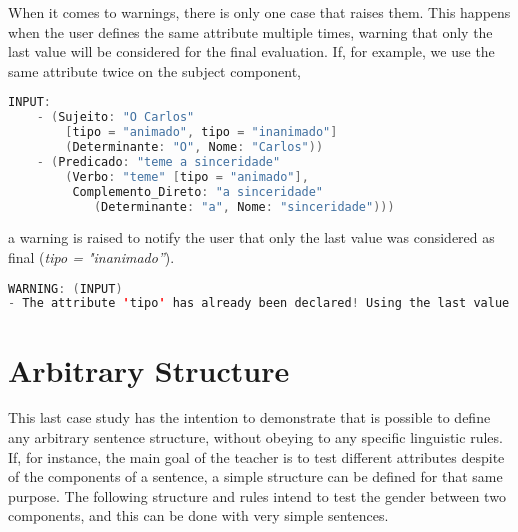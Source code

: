 When it comes to warnings, there is only one case that raises them. This happens when the user defines the same attribute multiple times, warning that only the last value 
will be considered for the final evaluation. If, for example, we use the same attribute twice on the subject component,

\begin{center}
\begin{minipage}{12cm}
\begin{lstlisting}[language=java, basicstyle=\small, label={lst:meta_input_attr_twice}, caption=Example of the students parsing with the same attribute in a single component]
INPUT:
    - (Sujeito: "O Carlos" 
        [tipo = "animado", tipo = "inanimado"]
        (Determinante: "O", Nome: "Carlos"))
    - (Predicado: "teme a sinceridade" 
        (Verbo: "teme" [tipo = "animado"], 
         Complemento_Direto: "a sinceridade" 
            (Determinante: "a", Nome: "sinceridade")))
\end{lstlisting}
\end{minipage}
\end{center}

\noindent a warning is raised to notify the user that only the last value was considered as final (\emph{tipo = "inanimado''}).

\begin{center}
\begin{minipage}{14cm}
\begin{lstlisting}[language=java, basicstyle=\small, label={lst:meta_input_missing_attr_warn}, caption=Example warning message of same attribute in a single component]
WARNING: (INPUT) 
- The attribute 'tipo' has already been declared! Using the last value found.
\end{lstlisting}
\end{minipage}
\end{center}

\section{Arbitrary Structure}

This last case study has the intention to demonstrate that is possible to define any arbitrary sentence structure, without obeying to any specific linguistic rules. If, for instance, the main goal of the teacher is to test
different attributes despite of the components of a sentence, a simple structure can be defined for that same purpose. The following structure and rules intend to test the gender between two components, and this can be done 
with very simple sentences.

